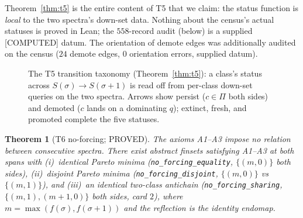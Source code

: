 \documentclass[11pt,a4paper]{article}
\newtheorem{theorem}{Theorem}
\theoremstyle{definition}
\begin{document}
Theorem~\ref{thm:t5} is the entire content of T5 that we claim: the
status function is \emph{local} to the two spectra's down-set data.
Nothing about the census's actual statuses is proved in Lean; the
$558$-record audit (below) is a supplied [COMPUTED] datum. The
orientation of demote edges was additionally audited on the census
($24$ demote edges, $0$ orientation errors, supplied datum).

\begin{figure}[t]
  \centering
  \caption{The T5 transition taxonomy (Theorem~\ref{thm:t5}): a class's
    status across $S(\sigma)\to S(\sigma+1)$ is read off from per-class
    down-set queries on the two spectra. Arrows show persist
    ($c\in\Pi$ both sides) and demoted ($c$ lands on a dominating
    $q$); extinct, fresh, and promoted complete the five statuses.}
  \label{fig:taxonomy}
\end{figure}

\begin{theorem}[T6 no-forcing; PROVED]
  \label{thm:t6}
  The axioms A1--A3 impose no relation between consecutive spectra.
  There exist abstract finsets satisfying A1--A3 at both spans with
  (i)~identical Pareto minima (\texttt{no\_forcing\_equality},
  $\{(m,0)\}$ both sides), (ii)~disjoint Pareto minima
  (\texttt{no\_forcing\_disjoint}, $\{(m,0)\}$ vs $\{(m,1)\}$), and
  (iii)~an identical two-class antichain
  (\texttt{no\_forcing\_sharing}, $\{(m,1),(m+1,0)\}$ both sides, card
  $2$), where $m=\max(f(\sigma),f(\sigma+1))$ and the reflection is the
  identity endomap.
\end{theorem}
\end{document}
